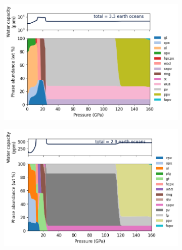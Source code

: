 \documentclass[linenumbers]{aastex631}
\begin{document}
\begin{figure}
     \centering
     \begin{subfigure}[b]{0.6\textwidth}
         \centering
         \includegraphics[width=\textwidth]{1M_80Ceff_2MASS19472449+4905040_1600K_modes_c_h2o}
         \label{fig:mgsi_hypatia10}
     \end{subfigure}
     \begin{subfigure}[b]{0.6\textwidth}
         \centering
         \includegraphics[width=\textwidth]{1M_80Ceff_2MASS19375133+4945541_1600K_modes_c_h2o}
         \label{fig:mgsi_hypatia50}
     \end{subfigure}
     \begin{subfigure}[b]{0.6\textwidth}
         \centering

\end{subfigure}
\end{figure}
\end{document}
